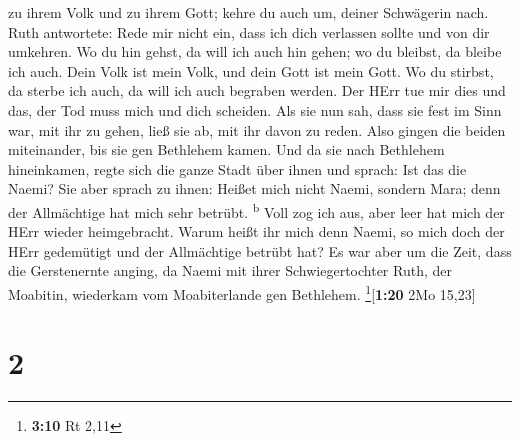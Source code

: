 zu ihrem Volk und zu ihrem Gott; kehre du auch um, deiner Schwägerin
nach.  Ruth antwortete: Rede mir nicht ein, dass ich dich
verlassen sollte und von dir umkehren. Wo du hin gehst, da will ich auch
hin gehen; wo du bleibst, da bleibe ich auch. Dein Volk ist mein Volk,
und dein Gott ist mein Gott.  Wo du stirbst, da sterbe
ich auch, da will ich auch begraben werden. Der HErr tue mir dies und
das, der Tod muss mich und dich scheiden.  Als sie nun
sah, dass sie fest im Sinn war, mit ihr zu gehen, ließ sie ab, mit ihr
davon zu reden.  Also gingen die beiden miteinander, bis
sie gen Bethlehem kamen. Und da sie nach Bethlehem hineinkamen, regte
sich die ganze Stadt über ihnen und sprach: Ist das die Naemi?
 Sie aber sprach zu ihnen: Heißet mich nicht Naemi,
sondern Mara; denn der Allmächtige hat mich sehr betrübt.
\textsuperscript{b}  Voll zog ich aus, aber leer hat mich
der HErr wieder heimgebracht. Warum heißt ihr mich denn Naemi, so mich
doch der HErr gedemütigt und der Allmächtige betrübt hat?
 Es war aber um die Zeit, dass die Gerstenernte anging,
da Naemi mit ihrer Schwiegertochter Ruth, der Moabitin, wiederkam vom
Moabiterlande gen Bethlehem. \footnote{\textbf{3:10} Rt 2,11}{[}\textbf{1:20}
2Mo 15,23{]}

\hypertarget{section-1}{%
\section{2}\label{section-1}}

